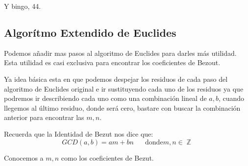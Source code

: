 \documentclass[12pt]{report}                                    %
\DeclareMathOperator \Space {\quad}                             %
\DeclareMathOperator \Integers  {\mathbb{Z}}                     %
\begin{document}
            Y bingo, 44.





        \clearpage
        \subsection{Algorítmo Extendido de Euclides}

            Podemos añadir mas pasos al algoritmo de Euclides para darles
            más utilidad. Esta utilidad es casi exclusiva para encontrar los
            coeficientes de Bezout.

            Ya idea básica esta en que podemos despejar los residuos de cada paso
            del algoritmo de Euclides original e ir sustituyendo cada uno de los residuos
            ya que podremos ir describiendo cada uno como una combinación lineal de $a,b$,
            cuando llegemos al último residuo, donde será cero, bastare con buscar la
            combinación anterior para encontrar las $m,n$.

            Recuerda que la Identidad de Bezut nos dice que:
            \begin{equation}
                GCD(a,b) = am +bn \Space \text{donde} m,n \in \Integers
            \end{equation}

            Conocemos a $m,n$ como los coeficientes de Bezut.
\end{document}
